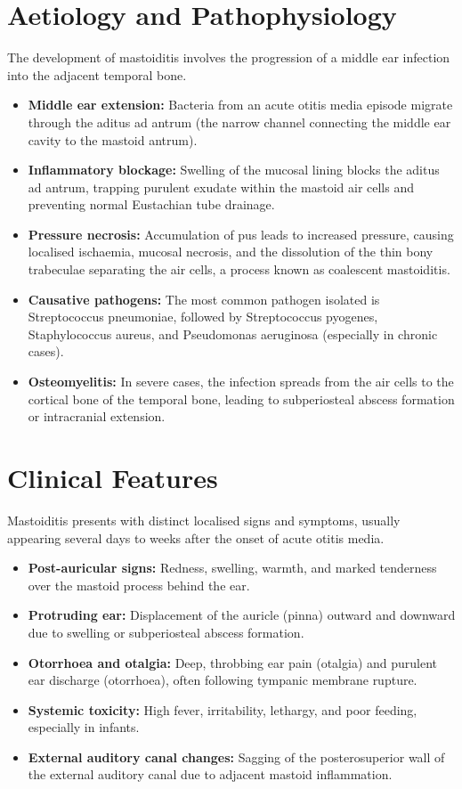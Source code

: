 \section*{Aetiology and Pathophysiology}
The development of mastoiditis involves the progression of a middle ear infection into the adjacent temporal bone.
\begin{itemize}
    \item \textbf{Middle ear extension:} Bacteria from an acute otitis media episode migrate through the aditus ad antrum (the narrow channel connecting the middle ear cavity to the mastoid antrum).
    \item \textbf{Inflammatory blockage:} Swelling of the mucosal lining blocks the aditus ad antrum, trapping purulent exudate within the mastoid air cells and preventing normal Eustachian tube drainage.
    \item \textbf{Pressure necrosis:} Accumulation of pus leads to increased pressure, causing localised ischaemia, mucosal necrosis, and the dissolution of the thin bony trabeculae separating the air cells, a process known as coalescent mastoiditis.
    \item \textbf{Causative pathogens:} The most common pathogen isolated is Streptococcus pneumoniae, followed by Streptococcus pyogenes, Staphylococcus aureus, and Pseudomonas aeruginosa (especially in chronic cases).
    \item \textbf{Osteomyelitis:} In severe cases, the infection spreads from the air cells to the cortical bone of the temporal bone, leading to subperiosteal abscess formation or intracranial extension.
\end{itemize}

\section*{Clinical Features}
Mastoiditis presents with distinct localised signs and symptoms, usually appearing several days to weeks after the onset of acute otitis media.
\begin{itemize}
    \item \textbf{Post-auricular signs:} Redness, swelling, warmth, and marked tenderness over the mastoid process behind the ear.
    \item \textbf{Protruding ear:} Displacement of the auricle (pinna) outward and downward due to swelling or subperiosteal abscess formation.
    \item \textbf{Otorrhoea and otalgia:} Deep, throbbing ear pain (otalgia) and purulent ear discharge (otorrhoea), often following tympanic membrane rupture.
    \item \textbf{Systemic toxicity:} High fever, irritability, lethargy, and poor feeding, especially in infants.
    \item \textbf{External auditory canal changes:} Sagging of the posterosuperior wall of the external auditory canal due to adjacent mastoid inflammation.
\end{itemize}

